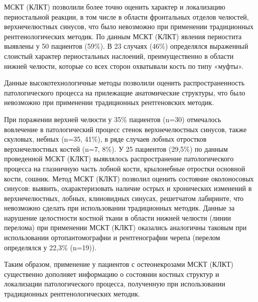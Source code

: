 \documentclass[11pt]{article}
\begin{document}
	 
	МСКТ (КЛКТ) позволили более точно оценить характер и локализацию периостальной реакции, в том числе в области фронтальных отделов челюстей, верхнечелюстных синусов, что 	было невозможно при применении традиционных рентгенологических методик. По данным МСКТ (КЛКТ) явления периостита выявлены у 50 пациентов (59\%). В 23 случаях (46\%) определялся выраженный слоистый характер периостальных наслоений, преимущественно в области нижней челюсти, которые со всех сторон	охватывали кость по типу «муфты».
	
	Данные высокотехнологичные методы позволили оценить распространенность патологического процесса на прилежащие анатомические структуры, что было невозможно при применении традиционных рентгеновских методик. 
	
	При поражении верхней челюсти у 35\% пациентов (n=30) отмечалось вовлечение в патологический процесс стенок верхнечелюстных	синусов, также скуловых, небных (n=35, 41\%), в ряде случаев лобных отростков верхнечелюстных костей (n=7, 8\%). У 25 пациентов (29,5\%) по данным проведенной МСКТ (КЛКТ) выявлялось распространение патологического процесса на глазничную часть лобной кости, крылонебные отростки основной кости, сошник. Метод 
	МСКТ (КЛКТ) позволил оценить состояние околоносовых синусов: выявить, охарактеризовать	наличие острых и хронических изменений в верхнечелюстных, лобных, клиновидных синусах, решетчатом лабиринте, что невозможно 
	сделать при использовании традиционных методик.  Данные за нарушение целостности костной ткани в области нижней челюсти (линии перелома) при применении МСКТ (КЛКТ) оказались  аналогичны таковым при использовании ортопантомографии и рентгенографии черепа (перелом определялся у 22,3\% (n=19)). 
	
	Таким образом, применение у пациентов с остеонекрозами МСКТ (КЛКТ) существенно дополняет информацию о состоянии костных	структур и локализации патологического процесса, полученную при использовании традиционных рентгенологических методик. ~\cite{rejr}
	
\end{document}

